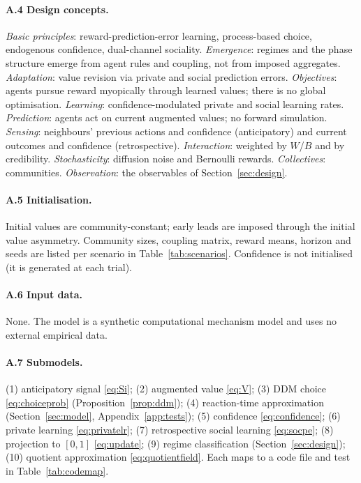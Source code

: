 \documentclass[11pt]{article}
\newcommand{\1}{\mathbf{1}}
\begin{document}
\paragraph{A.4 Design concepts.}
\emph{Basic principles}: reward-prediction-error learning, process-based choice,
endogenous confidence, dual-channel sociality. \emph{Emergence}: regimes and the
phase structure emerge from agent rules and coupling, not from imposed
aggregates. \emph{Adaptation}: value revision via private and social prediction
errors. \emph{Objectives}: agents pursue reward myopically through learned
values; there is no global optimisation. \emph{Learning}: confidence-modulated
private and social learning rates. \emph{Prediction}: agents act on current
augmented values; no forward simulation. \emph{Sensing}: neighbours' previous
actions and confidence (anticipatory) and current outcomes and confidence
(retrospective). \emph{Interaction}: weighted by $W$/$B$ and by credibility.
\emph{Stochasticity}: diffusion noise and Bernoulli rewards. \emph{Collectives}:
communities. \emph{Observation}: the observables of Section~\ref{sec:design}.

\paragraph{A.5 Initialisation.}
Initial values are community-constant; early leads are imposed through the
initial value asymmetry. Community sizes, coupling matrix, reward means, horizon
and seeds are listed per scenario in Table~\ref{tab:scenarios}. Confidence is not
initialised (it is generated at each trial).

\paragraph{A.6 Input data.}
None. The model is a synthetic computational mechanism model and uses no external
empirical data.

\paragraph{A.7 Submodels.}
(1) anticipatory signal \eqref{eq:Si}; (2) augmented value \eqref{eq:V};
(3) DDM choice \eqref{eq:choiceprob} (Proposition~\ref{prop:ddm});
(4) reaction-time approximation (Section~\ref{sec:model}, Appendix~\ref{app:tests});
(5) confidence \eqref{eq:confidence}; (6) private learning \eqref{eq:privatelr};
(7) retrospective social learning \eqref{eq:socpe}; (8) projection to $[0,1]$
\eqref{eq:update}; (9) regime classification (Section~\ref{sec:design});
(10) quotient approximation \eqref{eq:quotientfield}. Each maps to a code file
and test in Table~\ref{tab:codemap}.
\end{document}
